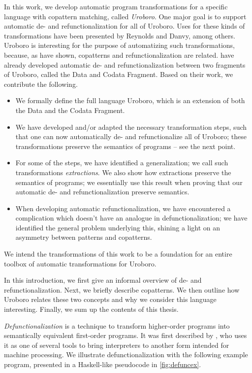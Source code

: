In this work, we develop automatic program transformations for a specific language with copattern matching, called \textit{Uroboro}. One major goal is to support automatic de- and refunctionalization for all of Uroboro. Uses for these kinds of transformations have been presented by Reynolds and Danvy, among others. Uroboro is interesting for the purpose of automatizing such transformations, because, as \citet{rendel15automatic} have shown, copatterns and refunctionalization are related. \citeauthor{rendel15automatic} have already developed automatic de- and refunctionalization between two fragments of Uroboro, called the Data and Codata Fragment. Based on their work, we contribute the following.
\begin{itemize}
\item We formally define the full language Uroboro, which is an extension of both the Data and the Codata Fragment.

\item We have developed and/or adapted the necessary transformation steps, such that one can now automatically de- and refunctionalize all of Uroboro; these transformations preserve the semantics of programs -- see the next point.

\item For some of the steps, we have identified a generalization; we call such transformations \textit{extractions}. We also show how extractions preserve the semantics of programs; we essentially use this result when proving that our automatic de- and refunctionalization preserve semantics.

\item When developing automatic refunctionalization, we have encountered a complication which doesn't have an analogue in defunctionalization; we have identified the general problem underlying this, shining a light on an asymmetry between patterns and copatterns.
\end{itemize}
We intend the transformations of this work to be a foundation for an entire toolbox of automatic transformations for Uroboro.

In this introduction, we first give an informal overview of de- and refunctionalization. Next, we briefly describe copatterns. We then outline how Uroboro relates these two concepts and why we consider this language interesting. Finally, we sum up the contents of this thesis.

\textit{Defunctionalization} is a technique to transform higher-order programs into semantically equivalent first-order programs. It was first described by \citet{reynolds72definitional}, who uses it as one of several tools to bring interpreters to another form intended for machine processing. We illustrate defunctionalization with the following example program, presented in a Haskell-like pseudocode in \autoref{fig:defuncex}.

